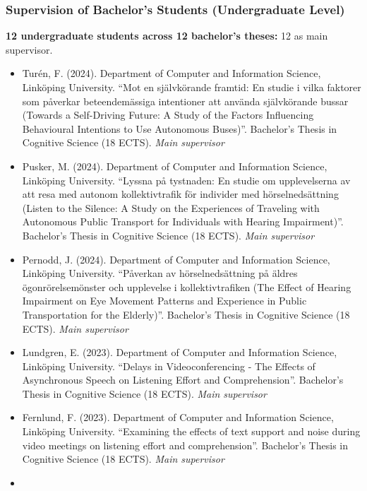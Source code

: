 \documentclass[]{article}
\begin{document}
\subsubsection{Supervision of Bachelor's Students (Undergraduate
Level)}\label{supervision-of-bachelors-students-undergraduate-level}

\textbf{12 undergraduate students across 12 bachelor's theses:} 12 as
main supervisor.

\begin{itemize}
\item
  Turén, F. (2024). Department of Computer and Information Science,
  Linköping University. ``Mot en självkörande framtid: En studie i vilka
  faktorer som påverkar beteendemässiga intentioner att använda
  självkörande bussar (Towards a Self-Driving Future: A Study of the
  Factors Influencing Behavioural Intentions to Use Autonomous Buses)''.
  Bachelor's Thesis in Cognitive Science (18 ECTS). \emph{Main
  supervisor}
\item
  Pusker, M. (2024). Department of Computer and Information Science,
  Linköping University. ``Lyssna på tystnaden: En studie om
  upplevelserna av att resa med autonom kollektivtrafik för individer
  med hörselnedsättning (Listen to the Silence: A Study on the
  Experiences of Traveling with Autonomous Public Transport for
  Individuals with Hearing Impairment)''. Bachelor's Thesis in Cognitive
  Science (18 ECTS). \emph{Main supervisor}
\item
  Pernodd, J. (2024). Department of Computer and Information Science,
  Linköping University. ``Påverkan av hörselnedsättning på äldres
  ögonrörelsemönster och upplevelse i kollektivtrafiken (The Effect of
  Hearing Impairment on Eye Movement Patterns and Experience in Public
  Transportation for the Elderly)''. Bachelor's Thesis in Cognitive
  Science (18 ECTS). \emph{Main supervisor}
\item
  Lundgren, E. (2023). Department of Computer and Information Science,
  Linköping University. ``Delays in Videoconferencing - The Effects of
  Asynchronous Speech on Listening Effort and Comprehension''.
  Bachelor's Thesis in Cognitive Science (18 ECTS). \emph{Main
  supervisor}
\item
  Fernlund, F. (2023). Department of Computer and Information Science,
  Linköping University. ``Examining the effects of text support and
  noise during video meetings on listening effort and comprehension''.
  Bachelor's Thesis in Cognitive Science (18 ECTS). \emph{Main
  supervisor}
\item

\end{itemize}
\end{document}
